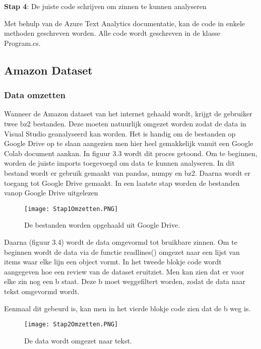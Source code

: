 \textbf{Stap 4}: De juiste code schrijven om zinnen te kunnen analyseren

Met behulp van de Azure Text Analytics documentatie, kan de code in enkele methoden geschreven worden. Alle code wordt geschreven in de klasse Program.cs. 

\subsection{Amazon Dataset}
\label{amazondatasetazure}

\subsubsection{Data omzetten}
\label{amazondatasetomzettenazure}
Wanneer de Amazon dataset van het internet gehaald wordt, krijgt de gebruiker twee bz2 bestanden. Deze moeten natuurlijk omgezet worden zodat de data in Visual Studio geanalyseerd kan worden. Het is handig om de bestanden op Google Drive op te slaan aangezien men hier heel gemakkelijk vanuit een Google Colab document aankan. In figuur 3.3 wordt dit proces getoond. Om te beginnen, worden de juiste imports toegevoegd om data te kunnen analyseren. In dit bestand wordt er gebruik gemaakt van pandas, numpy en bz2. Daarna wordt er toegang tot Google Drive gemaakt. In een laatste stap worden de bestanden vanop Google Drive uitgelezen

\begin{figure}[!htbp]
    \texttt{[image: Stap1Omzetten.PNG]}
    \caption{\label{stap1amazon}De bestanden worden opgehaald uit Google Drive.}
\end{figure}
\FloatBarrier

Daarna (figuur 3.4) wordt de data omgevormd tot bruikbare zinnen. Om te beginnen wordt de data via de functie readlines() omgezet naar een lijst van items waar elke lijn een object vormt. In het tweede blokje code wordt aangegeven hoe een review van de dataset eruitziet. Men kan zien dat er voor elke zin nog een b staat. Deze b moet weggefiltert worden, zodat de data naar tekst omgevormd wordt. 

Eenmaal dit gebeurd is, kan men in het vierde blokje code zien dat de b weg is.

\begin{figure}[!htbp]
    \texttt{[image: Stap2Omzetten.PNG]}
    \caption{\label{stap2amazon}De data wordt omgezet naar tekst.}
\end{figure}
\FloatBarrier

